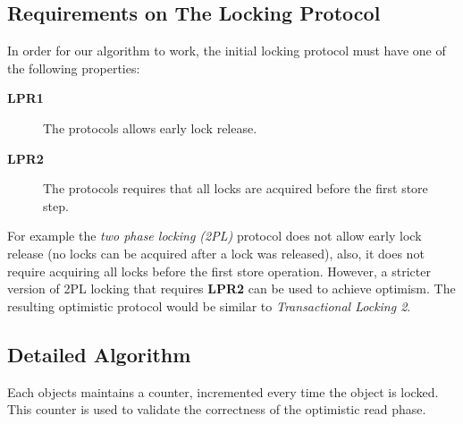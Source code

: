 \documentclass{article}
\newcommand{\reqI}{\textbf{LPR1}\xspace}
\newcommand{\reqII}{\textbf{LPR2}\xspace}
\begin{document}
\subsection{Requirements on The Locking Protocol}
In order for our algorithm to work, the initial locking
protocol must have one of the following properties: 

\begin{description}
\item[\reqI] The protocols allows early lock release. 
\item[\reqII] The protocols requires that all locks are acquired 
before the first store step.    
\end{description}
    

For example the \emph{two phase locking (2PL)} protocol 
does not allow early lock release (no locks can be acquired after a 
lock was released), also, it does not require acquiring all locks
before the first store operation. However, a stricter version 
of 2PL locking that requires \reqII can be used to achieve optimism. 
The resulting optimistic protocol would be similar to 
\emph{Transactional Locking 2}\cite{DiceSS2006}.   



\subsection{Detailed Algorithm}
Each objects maintains a counter, incremented every time the 
object is locked. This counter is used to validate the correctness
of the optimistic read phase. 
\end{document}
